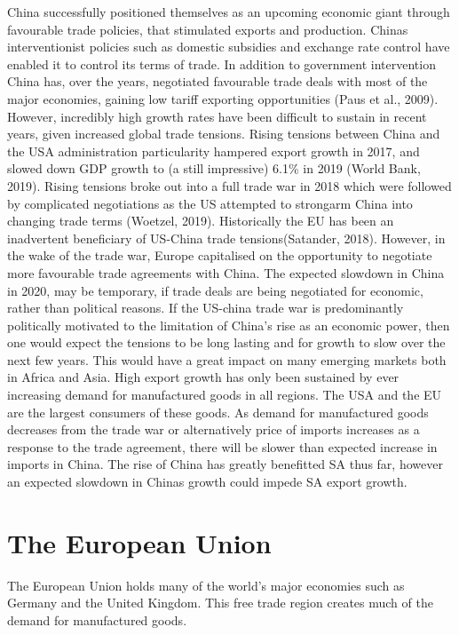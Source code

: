 \documentclass[11pt,preprint, authoryear]{elsarticle}
\numberwithin{equation}{section}
\numberwithin{figure}{section}
\numberwithin{table}{section}
\begin{document}
China successfully positioned themselves as an upcoming economic giant
through favourable trade policies, that stimulated exports and
production. Chinas interventionist policies such as domestic subsidies
and exchange rate control have enabled it to control its terms of trade.
In addition to government intervention China has, over the years,
negotiated favourable trade deals with most of the major economies,
gaining low tariff exporting opportunities (Paus et al., 2009). However,
incredibly high growth rates have been difficult to sustain in recent
years, given increased global trade tensions. Rising tensions between
China and the USA administration particularity hampered export growth in
2017, and slowed down GDP growth to (a still impressive) 6.1\% in 2019
(World Bank, 2019). Rising tensions broke out into a full trade war in
2018 which were followed by complicated negotiations as the US attempted
to strongarm China into changing trade terms (Woetzel, 2019).
Historically the EU has been an inadvertent beneficiary of US-China
trade tensions(Satander, 2018). However, in the wake of the trade war,
Europe capitalised on the opportunity to negotiate more favourable trade
agreements with China. The expected slowdown in China in 2020, may be
temporary, if trade deals are being negotiated for economic, rather than
political reasons. If the US-china trade war is predominantly
politically motivated to the limitation of China's rise as an economic
power, then one would expect the tensions to be long lasting and for
growth to slow over the next few years. This would have a great impact
on many emerging markets both in Africa and Asia. High export growth has
only been sustained by ever increasing demand for manufactured goods in
all regions. The USA and the EU are the largest consumers of these
goods. As demand for manufactured goods decreases from the trade war or
alternatively price of imports increases as a response to the trade
agreement, there will be slower than expected increase in imports in
China. The rise of China has greatly benefitted SA thus far, however an
expected slowdown in Chinas growth could impede SA export growth.

\hypertarget{the-european-union}{%
\section{\texorpdfstring{The European Union
\label{Europe}}{The European Union }}\label{the-european-union}}

The European Union holds many of the world's major economies such as
Germany and the United Kingdom. This free trade region creates much of
the demand for manufactured goods.
\end{document}
